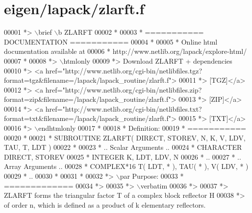 \hypertarget{eigen_2lapack_2zlarft_8f_source}{}\section{eigen/lapack/zlarft.f}
\label{eigen_2lapack_2zlarft_8f_source}

\begin{DoxyCode}
00001 \textcolor{comment}{*> \(\backslash\)brief \(\backslash\)b ZLARFT}
00002 \textcolor{comment}{*}
00003 \textcolor{comment}{*  =========== DOCUMENTATION ===========}
00004 \textcolor{comment}{*}
00005 \textcolor{comment}{* Online html documentation available at }
00006 \textcolor{comment}{*            http://www.netlib.org/lapack/explore-html/ }
00007 \textcolor{comment}{*}
00008 \textcolor{comment}{*> \(\backslash\)htmlonly}
00009 \textcolor{comment}{*> Download ZLARFT + dependencies }
00010 \textcolor{comment}{*> <a
       href="http://www.netlib.org/cgi-bin/netlibfiles.tgz?format=tgz&filename=/lapack/lapack\_routine/zlarft.f"> }
00011 \textcolor{comment}{*> [TGZ]</a> }
00012 \textcolor{comment}{*> <a
       href="http://www.netlib.org/cgi-bin/netlibfiles.zip?format=zip&filename=/lapack/lapack\_routine/zlarft.f"> }
00013 \textcolor{comment}{*> [ZIP]</a> }
00014 \textcolor{comment}{*> <a
       href="http://www.netlib.org/cgi-bin/netlibfiles.txt?format=txt&filename=/lapack/lapack\_routine/zlarft.f"> }
00015 \textcolor{comment}{*> [TXT]</a>}
00016 \textcolor{comment}{*> \(\backslash\)endhtmlonly }
00017 \textcolor{comment}{*}
00018 \textcolor{comment}{*  Definition:}
00019 \textcolor{comment}{*  ===========}
00020 \textcolor{comment}{*}
00021 \textcolor{comment}{*       SUBROUTINE ZLARFT( DIRECT, STOREV, N, K, V, LDV, TAU, T, LDT )}
00022 \textcolor{comment}{* }
00023 \textcolor{comment}{*       .. Scalar Arguments ..}
00024 \textcolor{comment}{*       CHARACTER          DIRECT, STOREV}
00025 \textcolor{comment}{*       INTEGER            K, LDT, LDV, N}
00026 \textcolor{comment}{*       ..}
00027 \textcolor{comment}{*       .. Array Arguments ..}
00028 \textcolor{comment}{*       COMPLEX*16         T( LDT, * ), TAU( * ), V( LDV, * )}
00029 \textcolor{comment}{*       ..}
00030 \textcolor{comment}{*  }
00031 \textcolor{comment}{*}
00032 \textcolor{comment}{*> \(\backslash\)par Purpose:}
00033 \textcolor{comment}{*  =============}
00034 \textcolor{comment}{*>}
00035 \textcolor{comment}{*> \(\backslash\)verbatim}
00036 \textcolor{comment}{*>}
00037 \textcolor{comment}{*> ZLARFT forms the triangular factor T of a complex block reflector H}
00038 \textcolor{comment}{*> of order n, which is defined as a product of k elementary reflectors.}

\end{DoxyCode}
